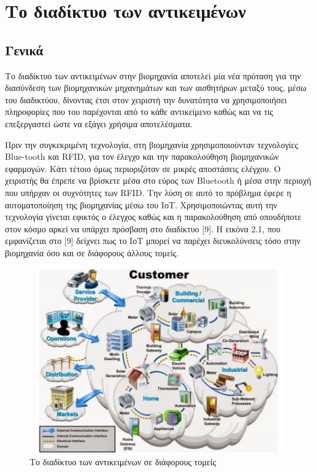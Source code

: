 
\chapter{Το διαδίκτυο των αντικειμένων} %

\label{Chapter2} %





\section{Γενικά}
Το διαδίκτυο των αντικειμένων στην βιομηχανία αποτελεί μία νέα πρόταση για την διασύνδεση των βιομηχανικών μηχανη­μάτων και των αισθητήρων μεταξύ τους, μέσω του διαδικτύου, δί­νοντας έτσι στον χειριστή την δυνατότητα να χρησιμοποιήσει πληροφορίες που του παρέχονται από το κάθε αντικείμενο καθώς και να τις επεξεργαστεί ώστε να εξάγει χρήσιμα αποτελέσματα. 

Πριν την συγκεκριμένη τεχνολογία, στη βιομηχανία χρησιμοποιούνταν τεχνολογίες Blue-tooth και RFID, για τον έλεγχο και την παρακολούθηση βιομηχανικών εφαρμογών. Κάτι τέτοιο όμως περιοριζόταν σε μικρές αποστάσεις ελέγχου. Ο χειριστής θα έπρε­πε να βρίσκετε μέσα στο εύρος των Bluetooth ή μέσα στην περιο­χή που υπήρχαν οι συχνότητες των RFID. Την λύση σε αυτό το πρόβλημα έφερε η αυτοματοποίηση της βιομηχανίας μέσω του ΙοΤ. Χρησιμοποιώντας αυτή την τεχνολογία γίνεται εφικτός ο έλεγχος καθώς και η παρακολούθηση από οπουδήποτε στον κόσμο αρκεί να υπάρχει πρόσβαση στο διαδίκτυο [9]. Η εικόνα 2.1, που εμφανίζεται στο [9] δείχνει πως το ΙοΤ μπορεί να παρέχει διευκολύνσεις τόσο στην βιομηχανία όσο και σε διάφορους άλλους τομείς.


\begin{figure}[htbp]
	\centering
		\includegraphics[height=8cm,width=12cm]{Figures/1.png}
	\caption{Το διαδίκτυο των αντικειμένων σε διάφορους τομείς \cite{Niranjan} }	
\end{figure}

